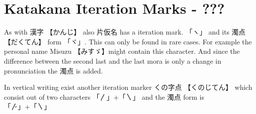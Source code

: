 \section{Katakana Iteration Marks - ??? } \label{sec:Iteration}

As with {漢字} {【かんじ】} also {片仮名} has a iteration mark.  「ヽ」 and its
{濁点} {【だくてん】} form {「ヾ」}. This can only be
found in rare cases. For example the personal name Misuzu 【みすゞ】might
contain this character. And since the difference between the second last
and the last mora is only a change in pronunciation the {濁点} is added.

In vertical writing exist another iteration marker {くの字点} {【くのじてん】}
which consist out of two characters {「〳」+「〵」} and the {濁点} form
is {「〴」+「〵」}

